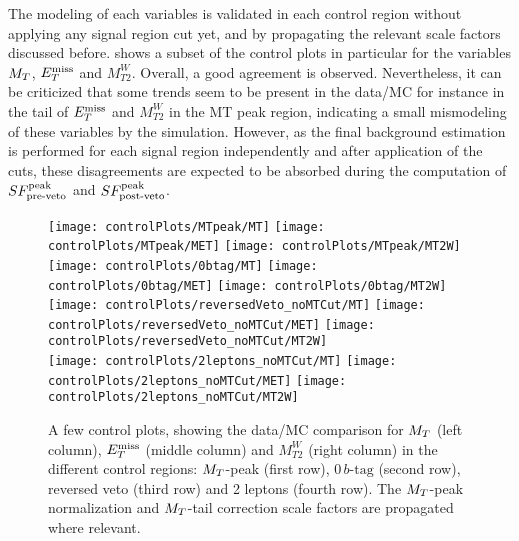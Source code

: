         The modeling of each variables is validated in each control region without applying
        any signal region cut yet, and by propagating the relevant scale factors discussed
        before.  shows a subset of the control plots
        in particular for the variables $M_T$, $E_T^\text{miss}$ and $M_{T2}^W$. Overall, a good
        agreement is observed. Nevertheless, it can be criticized that some trends
        seem to be present in the data/MC for instance in the tail of $E_T^\text{miss}$ and $M_{T2}^W$
        in the MT peak region, indicating a small mismodeling of these variables by
        the simulation. However, as the final background estimation is performed for
        each signal region independently and after application of the cuts, these disagreements
        are expected to be absorbed during the computation of $SF_{\text{pre-veto}}^{\text{peak}}$ and $SF_{\text{post-veto}}^{\text{peak}}$.

            \begin{figure}[h!]
                \centering
                \texttt{[image: controlPlots/MTpeak/MT]}
                \texttt{[image: controlPlots/MTpeak/MET]}
                \texttt{[image: controlPlots/MTpeak/MT2W]}\\
                \texttt{[image: controlPlots/0btag/MT]}
                \texttt{[image: controlPlots/0btag/MET]}
                \texttt{[image: controlPlots/0btag/MT2W]}\\
                \texttt{[image: controlPlots/reversedVeto\_noMTCut/MT]}
                \texttt{[image: controlPlots/reversedVeto\_noMTCut/MET]}
                \texttt{[image: controlPlots/reversedVeto\_noMTCut/MT2W]}\\
                \texttt{[image: controlPlots/2leptons\_noMTCut/MT]}
                \texttt{[image: controlPlots/2leptons\_noMTCut/MET]}
                \texttt{[image: controlPlots/2leptons\_noMTCut/MT2W]}\\
                \caption{A few control plots, showing the data/MC comparison for $M_T$ (left column),
                        $E_T^\text{miss}$ (middle column) and $M_{T2}^W$ (right column) in the different control
                        regions: $M_T$-peak (first row), $0\, b\text{-tag}$ (second row), reversed veto (third
                        row) and 2 leptons (fourth row). The $M_T$-peak normalization and $M_T$-tail
                        correction scale factors are propagated where relevant.}
                        \label{fig:preselControlPlots}
            \end{figure}

